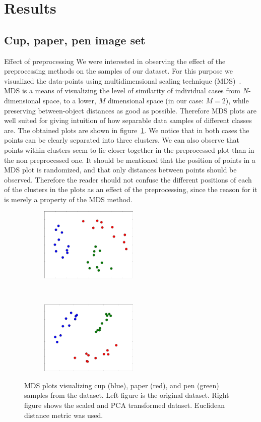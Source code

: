 \documentclass{article}
\newcommand{\enterProblemHeader}[1]{
}
\newcommand{\exitProblemHeader}[1]{
}
\newcounter{homeworkProblemCounter} %
\newcommand{\homeworkProblemName}{}
\newenvironment{homeworkProblem}[1][Problem \arabic{homeworkProblemCounter}]{ %
\stepcounter{homeworkProblemCounter} %
\renewcommand{\homeworkProblemName}{#1} %
\section{\homeworkProblemName} %
\enterProblemHeader{\homeworkProblemName} %
}{
\exitProblemHeader{\homeworkProblemName} %
}
\newcommand{\homeworkSectionName}{}
\newenvironment{homeworkSection}[1]{ %
\renewcommand{\homeworkSectionName}{#1} %
\subsection{\homeworkSectionName} %
\enterProblemHeader{\homeworkProblemName\ [\homeworkSectionName]} %
}{
\enterProblemHeader{\homeworkProblemName} %
}
\begin{document}
\begin{homeworkProblem}[Results]

\begin{homeworkSection}{Cup, paper, pen image set}

\begin{paragraph}{Effect of preprocessing}
We were interested in observing the effect of the preprocessing methods on the samples of our dataset. For this purpose we visualized the data-points using multidimensional scaling technique (MDS)~\cite{borg2005modern}. MDS is a means of visualizing the level of similarity of individual cases from $N$-dimensional space, to a lower, $M$ dimensional space (in our case: $M=2$), while preserving between-object distances as good as possible. Therefore MDS plots are well suited for giving intuition of how separable data samples of different classes are. The obtained plots are shown in figure~\ref{fig:mds_preprocessing}. We notice that in both cases the points can be clearly separated into three clusters. We can also observe that points within clusters seem to lie closer together in the preprocessed plot than in the non preprocessed one. It should be mentioned that the position of points in a MDS plot is randomized, and that only distances between points should be observed. Therefore the reader should not confuse the different positions of each of the clusters in the plots as an effect of the preprocessing, since the reason for it is merely a property of the MDS method.

\begin{figure}[t]
    \centering
    \begin{subfigure}[t]{0.4\textwidth}
        \centering
        \includegraphics[height=3.5cm]{img/mds_no_preprocessing}
    \end{subfigure}
   ~
    \begin{subfigure}[t]{0.4\textwidth}
        \centering
        \includegraphics[height=3.5cm]{img/mds_preprocessing}
        \end{subfigure}
  \caption{MDS plots visualizing cup (blue), paper (red), and pen (green) samples from the dataset. Left figure is the original dataset. Right figure shows the scaled and PCA transformed dataset. Euclidean distance metric was used.}
  \label{fig:mds_preprocessing}
\end{figure}


\end{paragraph}
\end{homeworkSection}
\end{homeworkProblem}
\end{document}
